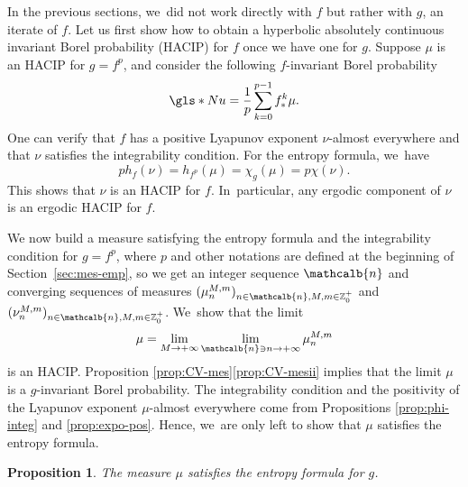 \documentclass[JEP,XML,SOM,Unicode,NoFloatCountersInSection,published]{cedram}
\newcommand{\mcbn}{{\mathcalb{n}}}
\newtheorem{prop}[thm]{Proposition}
\theoremstyle{definition}
\newcommand{\bbZ}{{\mathbb{Z}}}
\begin{document}
In the previous sections, we~did not work directly with $f$ but rather with $g$, an iterate of $f$. Let us first show how to obtain a hyperbolic absolutely continuous invariant Borel probability (\gls*{HACIP}) for $f$ once we have one for $g$.
Suppose $\mu$ is an HACIP for $g = f^p$, and consider the following $f$\nobreakdash-invariant Borel probability
\[
\gls*{Nu} = \frac{1}{p}\sum_{k=0}^{p-1} f^k_* \mu.
\]
One can verify that $f$ has a positive Lyapunov exponent $\nu$-almost everywhere and that $\nu$ satisfies the integrability condition.
For the entropy formula, we~have
\[
p h_f(\nu) = h_{f^p}(\mu) = \chi_g(\mu) = p \chi(\nu).
\]
This shows that $\nu$ is an HACIP for $f$. In~particular, any ergodic component of $\nu$ is an ergodic HACIP for $f$.

We now build a measure satisfying the entropy formula and the integrability condition for $g = f^p$, where $p$ and other notations are defined at the beginning of Section~\ref{sec:mes-emp}, so we get an integer sequence $\mcbn$ and converging sequences of measures $(\mu_n^{M,m})_{n \in \mcbn, M,m \in \bbZ_0^+}$ and $(\nu_n^{M,m})_{n \in \mcbn, M,m \in \bbZ_0^+}$. We~show that the limit
\[
\mu = \lim_{M \to +\infty} \lim_{\mcbn \ni n \to +\infty} \mu_n^{M,m}
\]
is an HACIP.
Proposition \ref{prop:CV-mes}\eqref{prop:CV-mesii} implies that the limit $\mu$ is a $g$-invariant Borel probability.
The integrability condition and the positivity of the Lyapunov exponent $\mu$\nobreakdash-almost everywhere come from Propositions \ref{prop:phi-integ} and \ref{prop:expo-pos}.
Hence, we~are only left to show that $\mu$ satisfies the entropy formula.

\begin{prop}
\label{prop:formule-entropie}
The measure $\mu$ satisfies the entropy formula for $g$.
\end{prop}
\end{document}
